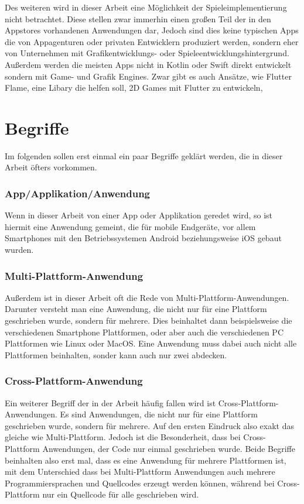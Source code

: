 Des weiteren wird in dieser Arbeit eine Möglichkeit der Spieleimplementierung nicht betrachtet. Diese stellen zwar immerhin einen großen Teil der in den Appstores vorhandenen Anwendungen dar, Jedoch sind dies keine typischen Apps die von Appagenturen oder privaten Entwicklern produziert werden, sondern eher von Unternehmen mit Grafikentwicklungs- oder Spieleentwicklungshintergrund. Außerdem werden die meisten Apps nicht in Kotlin oder Swift direkt entwickelt sondern mit Game- und Grafik Engines. Zwar gibt es auch Ansätze, wie Flutter Flame, eine Libary die helfen soll, 2D Games mit Flutter zu entwickeln, 

\section{Begriffe}
Im folgenden sollen erst einmal ein paar Begriffe geklärt werden, die in dieser Arbeit öfters vorkommen.
\subsubsection{App/Applikation/Anwendung}
Wenn in dieser Arbeit von einer App oder Applikation geredet wird, so ist hiermit eine Anwendung gemeint, die für mobile Endgeräte, vor allem Smartphones mit den Betriebssystemen Android beziehungsweise iOS gebaut wurden.
\subsubsection{Multi-Plattform-Anwendung}
Außerdem ist in dieser Arbeit oft die Rede von Multi-Plattform-Anwendungen. Darunter versteht man eine Anwendung, die nicht nur für eine Plattform geschrieben wurde, sondern für mehrere. Dies beinhaltet dann beispielsweise die verschiedenen Smartphone Plattformen, oder aber auch die verschiedenen PC Plattformen wie Linux oder MacOS. Eine Anwendung muss dabei auch nicht alle Plattformen beinhalten, sonder kann auch nur zwei abdecken. 
\subsubsection{Cross-Plattform-Anwendung}
Ein weiterer Begriff der in der Arbeit häufig fallen wird ist Cross-Plattform-Anwendungen. Es sind Anwendungen, die nicht nur für eine Plattform geschrieben wurde, sondern für mehrere. Auf den ersten Eindruck also exakt das gleiche wie Multi-Plattform. Jedoch ist die Besonderheit, dass bei Cross-Plattform Anwendungen, der Code nur einmal geschrieben wurde. Beide Begriffe beinhalten also erst mal, dass es eine Anwendung für mehrere Plattformen ist, mit dem Unterschied dass bei Multi-Plattform Anwendungen auch mehrere Programmiersprachen und Quellcodes erzeugt werden können, während bei Cross-Plattform nur ein Quellcode für alle geschrieben wird.


